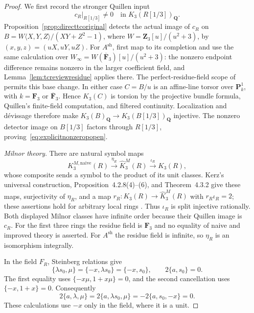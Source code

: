 \documentclass[11pt,a4paper]{article}
\theoremstyle{remark}
\begin{document}
\begin{proof}
We first record the stronger Quillen input
\begin{equation}\label{eq:explicitnonzeropopen}
 c_R|_{R[1/3]}\ne0\quad\text{in }K_3(R[1/3])_{\mathbf Q}.
\end{equation}
Proposition~\ref{prop:directtcoriginal} detects the actual image of
$c_R$ on
$B=W\langle X,Y,Z\rangle/(XY+Z^2-1)$, where
$W=\mathbf Z_3[u]/(u^2+3)$, by $(x,y,z)=(uX,uY,uZ)$.
For $A^{\mathrm{sh}}$, first map to its completion and use the same
calculation over
$W_\infty=W(\overline{\mathbf F}_3)[u]/(u^2+3)$:
the nonzero endpoint difference remains nonzero in the larger
coefficient field, and Lemma~\ref{lem:tcreviewresidue} applies there.
The perfect-residue-field scope of
\cite[Proposition~4.10]{AMMN} permits this base change.
In either case $C=B/u$ is an affine-line torsor over
$\mathbf P^1_k$, with $k=\mathbf F_3$ or
$\overline{\mathbf F}_3$. Hence $K_3(C)$ is torsion by the projective
bundle formula, Quillen's finite-field computation, and filtered
continuity. Localization and d\'evissage therefore make
$K_3(B)_{\mathbf Q}\to K_3(B[1/3])_{\mathbf Q}$ injective.
The nonzero detector image on $B[1/3]$ factors through $R[1/3]$,
proving~\eqref{eq:explicitnonzeropopen}.

\emph{Milnor theory.}
There are natural symbol maps
\[
 K_3^{M,\mathrm{naive}}(R)
 \xrightarrow{\eta_R}\widehat K_3^M(R)
 \xrightarrow{\iota_R}K_3(R),
\]
whose composite sends a symbol to the product of its unit classes.
Kerz's universal construction, Proposition~4.2.8(4)--(6), and
Theorem~4.3.2 give these maps, surjectivity of $\eta_R$, and a map
$r_R:K_3(R)\to\widehat K_3^M(R)$ with
$r_R\iota_R=2$; these assertions hold for arbitrary local rings
\cite[Theorem~4.2.5, Proposition~4.2.8, Theorem~4.3.2]{KerzThesis}.
Thus $\iota_R$ is split injective rationally. Both displayed Milnor
classes have infinite order because their Quillen image is $c_R$.
For the first three rings the residue field is $\mathbf F_3$ and no
equality of naive and improved theory is asserted. For
$A^{\mathrm{sh}}$ the residue field is infinite, so $\eta_R$ is an
isomorphism integrally.

In the field $F_R$, Steinberg relations give
\[
 \{\lambda s_0,\mu\}
 =\{-x,\lambda s_0\}=\{-x,s_0\},
 \qquad 2\{a,s_0\}=0.
\]
The first equality uses $\{-x\mu,1+x\mu\}=0$, and the second
cancellation uses $\{-x,1+x\}=0$. Consequently
\[
 2\{a,\lambda,\mu\}
 =2\{a,\lambda s_0,\mu\}
 =-2\{a,s_0,-x\}=0.
\]
These calculations use $-x$ only in the field, where it is a unit.


\end{proof}
\end{document}
